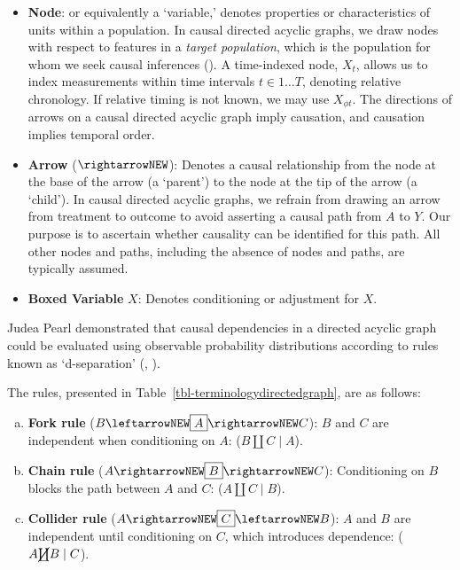 \documentclass[
  single column]{article}
\begin{document}
\begin{itemize}
\item
  \textbf{Node}: or equivalently a `variable,' denotes properties or
  characteristics of units within a population. In causal directed
  acyclic graphs, we draw nodes with respect to features in a
  \emph{target population}, which is the population for whom we seek
  causal inferences (). A
  time-indexed node, \(X_t\), allows us to index measurements within
  time intervals \(t \in 1\dots T\), denoting relative chronology. If
  relative timing is not known, we may use \(X_{\phi t}\). The
  directions of arrows on a causal directed acyclic graph imply
  causation, and causation implies temporal order.
\item
  \textbf{Arrow} (\(\rightarrowNEW\)): Denotes a causal relationship
  from the node at the base of the arrow (a `parent') to the node at the
  tip of the arrow (a `child'). In causal directed acyclic graphs, we
  refrain from drawing an arrow from treatment to outcome to avoid
  asserting a causal path from \(A\) to \(Y\). Our purpose is to
  ascertain whether causality can be identified for this path. All other
  nodes and paths, including the absence of nodes and paths, are
  typically assumed.
\item
  \textbf{Boxed Variable} \(\boxed{X}\): Denotes conditioning or
  adjustment for \(X\).
\end{itemize}

Judea Pearl demonstrated that causal dependencies in a directed acyclic
graph could be evaluated using observable probability distributions
according to rules known as `d-separation'
(,
).

The rules, presented in Table~\ref{tbl-terminologydirectedgraph}, are as
follows:

\begin{enumerate}[a)]
     \item  {\bf Fork rule} ($B \leftarrowNEW \boxed{A} \rightarrowNEW C$): $B$ and $C$ are independent when conditioning on $A$: ($B \coprod C \mid A$).
     \item  {\bf Chain rule} ($A \rightarrowNEW \boxed{B} \rightarrowNEW C$): Conditioning on $B$ blocks the path between $A$ and $C$: ($A \coprod C \mid B$).
     \item  {\bf Collider rule} ($A \rightarrowNEW \boxed{C} \leftarrowNEW B$): $A$ and $B$ are independent until conditioning on $C$, which introduces dependence: ($A \cancel{\coprod} B \mid C$). 
 \end{enumerate}
\end{document}
